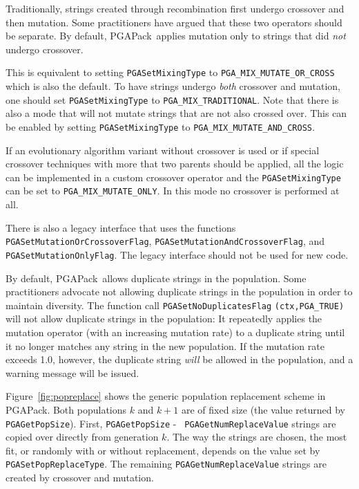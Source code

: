 \documentclass{report}
\newcommand{\pga}{PGAPack}
\begin{document}
Traditionally, strings created through recombination first undergo crossover
and then mutation.  Some practitioners \cite{Da91} have argued that these two
operators should be separate.  By default, \pga\ applies mutation only to
strings that did {\em not} undergo crossover.

This is equivalent to setting \verb+PGASetMixingType+ to
\verb+PGA_MIX_MUTATE_OR_CROSS+ which is also the default.
To have strings undergo {\em both} crossover and mutation, one should
set \verb+PGASetMixingType+ to \verb+PGA_MIX_TRADITIONAL+. Note that
there is also a mode that will not mutate strings that are not also
crossed over. This can be enabled by setting \verb+PGASetMixingType+ to
\verb+PGA_MIX_MUTATE_AND_CROSS+.

If an evolutionary algorithm variant without crossover is used or if
special crossover techniques with more that two parents should be
applied, all the logic can be implemented in a custom crossover operator
and the \verb+PGASetMixingType+ can be set to \verb+PGA_MIX_MUTATE_ONLY+.
In this mode no crossover is performed at all.

There is also a legacy interface that uses the functions
\verb+PGASetMutationOrCrossoverFlag+,
\verb+PGASetMutationAndCrossoverFlag+, and
\verb+PGASetMutationOnlyFlag+. The legacy interface should not be used
for new code.

By default, \pga\ allows duplicate strings in the population.  Some
practitioners advocate not allowing duplicate strings in the population in
order to maintain diversity.  The function call {\tt PGASetNoDuplicatesFlag}
{\tt (ctx,PGA\_TRUE)} will not allow duplicate strings in the population: It
repeatedly applies the mutation operator (with an increasing mutation rate) to
a duplicate string until it no longer matches any string in the new
population.  If the mutation rate exceeds 1.0, however, the duplicate string
{\em will} be allowed in the population, and a warning message will be issued.

Figure~\ref{fig:popreplace} shows the generic population replacement scheme in
\pga.  Both populations $k$ and $k+1$  are of fixed size (the value returned by
{\tt PGAGetPopSize}).  First, {\tt PGAGetPopSize} - {\tt
PGAGetNumReplaceValue} strings are copied over directly from generation $k$.
The way the strings are chosen, the most fit, or randomly with or without
replacement, depends on the value set by {\tt PGASetPopReplaceType}.  The
remaining {\tt PGAGetNumReplaceValue} strings are created by crossover and
mutation.
\end{document}
